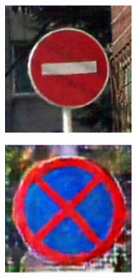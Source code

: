 \begin{figure}[H]
\begin{subfigure}{0.125\textwidth}
        \includegraphics[height=\textwidth]{../images/Taiwan Schilder/Generated1.png}
    \end{subfigure}
    \hspace{2em}%
    \begin{subfigure}{0.125\textwidth}
        \centering
        \includegraphics[height=\textwidth]{../images/Taiwan Schilder/Generated2.png}

\end{subfigure}
\end{figure}
